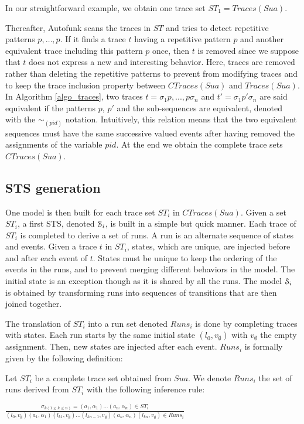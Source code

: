 In our straightforward example, we obtain one trace set
$ST_1=Traces(Sua)$.

Thereafter, Autofunk scans the traces in $ST$ and tries
to detect repetitive patterns $p,\dots,p$. If it finds a trace $t$
having a repetitive pattern $p$ and another equivalent trace
including this pattern $p$ once, then $t$ is removed since we
suppose that $t$ does not express a new and interesting
behavior. Here, traces are removed rather than deleting the
repetitive patterns to prevent from modifying traces and to keep
the trace inclusion property between $CTraces(Sua)$ and
$Traces(Sua)$.
In Algorithm \ref{algo_traces}, two traces $t=\sigma_1 p,...,p
\sigma_n$ and $t'=\sigma_1 p' \sigma_n$ are said equivalent if
the patterns $p$, $p'$ and the sub-sequences are equivalent,
denoted with the $\sim_{(pid)}$ notation. Intuitively, this
relation means that the two equivalent sequences must have the
same successive valued events after having removed the
assignments of the variable $pid$. At the end we obtain the complete
trace sets $CTraces(Sua)$.

\subsection{STS generation}
\label{sec:modelinf:prodsystems:generation}

One model is then built for each trace set $ST_i$ in
$CTraces(Sua)$. Given a set $ST_i$, a first STS, denoted
$\EuScript{S}_i$, is built in a simple but quick manner. Each
trace of $ST_i$ is completed to derive a set of runs. A run is an
alternate sequence of states and events. Given a trace $t$ in
$ST_i$, states, which are unique, are injected before and after
each event of $t$. States must be unique to keep the ordering of
the events in the runs, and to prevent merging different
behaviors in the model.  The initial state is an exception
though as it is shared by all the runs. The model
$\EuScript{S}_i$ is obtained by transforming runs into sequences
of transitions that are then joined together.

The translation of $ST_i$ into a run set denoted $Runs_i$ is done
by completing traces with states. Each run starts by the same
initial state $(l_0,v_\emptyset)$ with $v_\emptyset$ the empty
assignment. Then, new states are injected after each event.
$Runs_i$ is formally given by the following definition:

\begin{definition}
    Let $ST_i$ be a complete trace set obtained from $\mathit{Sua}$. We
denote $Runs_i$ the set of runs derived from $ST_i$ with the
following inference rule:
  \begin{center}
    $\frac{\sigma_{k(1\leq k \leq n)}=(a_1,\alpha_1)...(a_n,\alpha_n) \in ST_i}
    {(l_0,v_\emptyset) (a_1,\alpha_1) (l_{k1},v_\emptyset) \dots (l_{kn-1},v_\emptyset) (a_n,\alpha_n) (l_{kn},v_\emptyset) \in Runs_i}$
  \end{center}
\end{definition}

